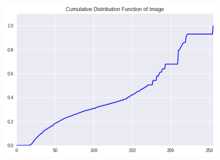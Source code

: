 \documentclass{article}
\begin{document}
\begin{enumerate}[label=B\arabic*)]
\begin{figure}[h!]
\begin{minipage}{0.32\textwidth}
			\end{minipage}
			\hfill
			\begin{minipage}{0.32\textwidth}
				\centering
				\includegraphics[width=0.9\linewidth]{Chino/After/CDF.png}
			\end{minipage}
		\end{figure}
		
\end{enumerate}
\end{document}
